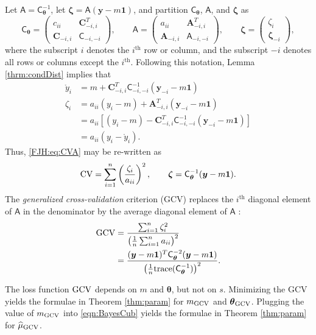 \documentclass{svjour3}                     %
\newcommand{\bm}[1]{\boldsymbol{#1}}
\newcommand{\trace}[1]{\textup{trace}{#1}}
\newcommand{\vtheta}{{\bm{\theta}}}
\newcommand{\vzeta}{{\bm{\zeta}}}
\newcommand{\vA}{\bm{A}}
\newcommand{\vC}{\bm{C}}
\newcommand{\vy}{\bm{y}}
\newcommand{\vone}{\bm{1}}
\newcommand{\mA}{\mathsf{A}}
\newcommand{\mC}{\mathsf{C}}
\newcommand{\GCV}{\textup{GCV}}
\begin{document}
Let $\mA = \mC^{-1}_\vtheta$, let $\vzeta = \mA (\vy - m \vone)$, and partition $\mC_\vtheta$, $\mA$, and $\vzeta$ as
\begin{equation*}
\mC_\vtheta = \begin{pmatrix} c_{ii}  & \vC_{-i,i}^T \\  \vC_{-i,i} & \mC_{-i,-i}\end{pmatrix}, \qquad
\mA = \begin{pmatrix} a_{ii}  & \vA_{-i,i}^T \\  \vA_{-i,i} & \mA_{-i,-i}\end{pmatrix}, \qquad \vzeta = \begin{pmatrix} \zeta_i   \\  \vzeta_{-i} \end{pmatrix},
\end{equation*}
where the subscript $i$ denotes the $i^{\text{th}}$ row or column, and the subscript $-i$ denotes all rows or columns except the $i^{\text{th}}$. Following this notation, Lemma \ref{thrm:condDist} implies that 
\begin{align*}
\mathring{y}_i & = m + \vC^T_{-i,i} \mC_{-i,-i}^{-1} (\vy_{-i} -m \vone)  \\
\zeta_i  & = a_{ii}(y_i - m) + \vA_{-i,i}^T(\vy_{-i} - m \vone) \\
& = a_{ii}[(y_i - m) - \vC^T_{-i,i} \mC_{-i,-i}^{-1} (\vy_{-i} -m \vone)] \\
& = a_{ii}(y_i - \mathring{y}_i).
\end{align*}
Thus, \eqref{FJH:eq:CVA} may be re-written as 
\begin{align*} %
\textup{CV} = \sum_{i=1}^n \left(\frac{\zeta_i}{a_{ii}} \right)^2, \qquad \vzeta = \mC^{-1}_\vtheta(\vy - m \vone).
\end{align*}
The \emph{generalized cross-validation} criterion (GCV) replaces the $i^{\text{th}}$ diagonal element of $\mA$ in the denominator by the average diagonal element of $\mA$ \cite{CraWah79a,GolHeaWah79a,Wah90}:
\begin{align*} 
\textup{GCV} &
= \frac{\sum_{i=1}^n\zeta_i^2}{\left(\frac 1n \sum_{i=1}^n a_{ii} \right)^2} \\
& = \frac{(\vy - m\vone)^T \mC^{-2}_\vtheta (\vy - m \vone)}{\left(\frac 1n \trace(\mC_\vtheta^{-1}) \right)^2}.
\end{align*}

The loss function $\textup{GCV}$ depends on $m$ and $\vtheta$, but not on $s$.  Minimizing the GCV  yields the formulae in Theorem \ref{thm:param} for $m_{\textup{GCV}}$ and $\vtheta_{\textup{GCV}}$.  
Plugging the value of $m_\GCV$ into \eqref{eqn:BayesCub} yields the formulae in Theorem \ref{thm:param} for $\widehat{\mu}_{\textup{GCV}}$.
\end{document}
